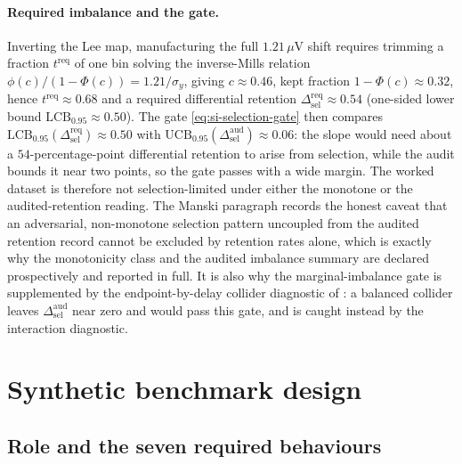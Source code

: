 \documentclass[11pt,a4paper]{article}
\theoremstyle{definition}
\newcommand{\UCB}{\mathrm{UCB}_{0.95}}
\newcommand{\LCB}{\mathrm{LCB}_{0.95}}
\begin{document}
\paragraph{Required imbalance and the gate.} Inverting the Lee map, manufacturing
the full \(1.21\,\mu\mathrm{V}\) shift requires trimming a fraction
\(t^{\mathrm{req}}\) of one bin solving the inverse-Mills relation
\(\phi(c)/(1-\Phi(c))=1.21/\sigma_y\), giving \(c\approx0.46\), kept fraction
\(1-\Phi(c)\approx0.32\), hence \(t^{\mathrm{req}}\approx0.68\) and a required
differential retention \(\Delta_{\mathrm{sel}}^{\mathrm{req}}\approx0.54\)
(one-sided lower bound \(\LCB\approx0.50\)). The gate \eqref{eq:si-selection-gate}
then compares \(\LCB(\Delta_{\mathrm{sel}}^{\mathrm{req}})\approx0.50\) with
\(\UCB(\Delta_{\mathrm{sel}}^{\mathrm{aud}})\approx0.06\): the slope would need
about a \(54\)-percentage-point differential retention to arise from selection,
while the audit bounds it near two points, so the gate passes with a wide margin.
The worked dataset is therefore not selection-limited under either the monotone or
the audited-retention reading. The Manski paragraph records the honest caveat
that an adversarial, non-monotone selection pattern uncoupled from the audited
retention record cannot be excluded by retention rates alone, which is exactly why
the monotonicity class and the audited imbalance summary are declared
prospectively and reported in full. It is also why the marginal-imbalance gate is
supplemented by the endpoint-by-delay collider diagnostic of :
a balanced collider leaves \(\Delta_{\mathrm{sel}}^{\mathrm{aud}}\) near zero and
would pass this gate, and is caught instead by the interaction diagnostic.

\section{Synthetic benchmark design}
\label{sec:si-synthetic-benchmarks}

\subsection{Role and the seven required behaviours}
\label{sec:si-benchmark-role}
\end{document}
